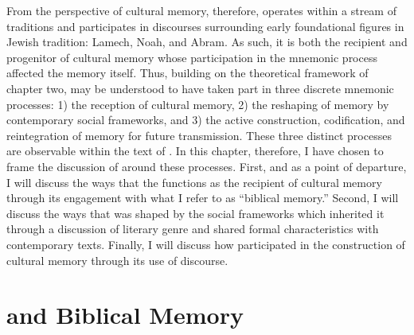 From the perspective of cultural memory, therefore, \ga operates within a stream of traditions and participates in discourses surrounding early foundational figures in Jewish tradition: Lamech, Noah, and Abram. As such, it is both the recipient and progenitor of cultural memory whose participation in the mnemonic process affected the memory itself. Thus, building on the theoretical framework of chapter two, \ga may be understood to have taken part in three discrete mnemonic processes: 1) the reception of cultural memory, 2) the reshaping of memory by contemporary social frameworks, and 3) the active construction, codification, and reintegration of memory for future transmission. These three distinct processes are observable within the text of \ga. In this chapter, therefore, I have chosen to frame the discussion of \ga around these processes. First, and as a point of departure, I will discuss the ways that the \ga functions as the recipient of cultural memory through its engagement with what I refer to as  ``biblical memory.'' Second, I will discuss the ways that \ga was shaped by the social frameworks which inherited it through a discussion of literary genre and shared formal characteristics with contemporary texts. Finally, I will discuss how \ga participated in the construction of cultural memory through its use of \psgraphical discourse.


\section{\ga and Biblical Memory}

